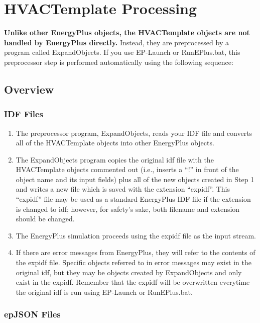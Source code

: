 \section{HVACTemplate Processing}\label{hvactemplate-processing}

\textbf{Unlike other EnergyPlus objects, the HVACTemplate objects are not handled by EnergyPlus directly.} Instead, they are preprocessed by a program called ExpandObjects. If you use EP-Launch or RunEPlus.bat, this preprocessor step is performed automatically using the following sequence:

\subsection{Overview}

\subsubsection*{IDF Files}

\begin{enumerate}
\def\labelenumi{\arabic{enumi})}
\item
  The preprocessor program, ExpandObjects, reads your IDF file and converts all of the HVACTemplate objects into other EnergyPlus objects.
\item
  The ExpandObjects program copies the original idf file with the HVACTemplate objects commented out (i.e., inserts a ``!'' in front of the object name and its input fields) plus all of the new objects created in Step 1 and writes a new file which is saved with the extension ``expidf''. This ``expidf'' file may be used as a standard EnergyPlus IDF file if the extension is changed to idf; however, for safety's sake, both filename and extension should be changed.
\item
  The EnergyPlus simulation proceeds using the expidf file as the input stream.
\item
  If there are error messages from EnergyPlus, they will refer to the contents of the expidf file. Specific objects referred to in error messages may exist in the original idf, but they may be objects created by ExpandObjects and only exist in the expidf. Remember that the expidf will be overwritten everytime the original idf is run using EP-Launch or RunEPlus.bat.
\end{enumerate}

\subsubsection*{epJSON Files}

